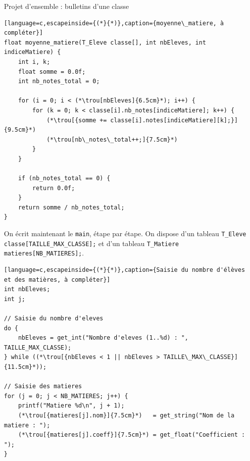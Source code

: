 \begin{UPSTIexercice}{Projet d'ensemble : bulletins d'une classe}
    \begin{lstlisting}[language=c,escapeinside={(*}{*)},caption={moyenne\_matiere, à compléter}]
float moyenne_matiere(T_Eleve classe[], int nbEleves, int indiceMatiere) {
    int i, k;
    float somme = 0.0f;
    int nb_notes_total = 0;

    for (i = 0; i < (*\trou[nbEleves]{6.5cm}*); i++) {
        for (k = 0; k < classe[i].nb_notes[indiceMatiere]; k++) {
            (*\trou[{somme += classe[i].notes[indiceMatiere][k];}]{9.5cm}*)
            (*\trou[nb\_notes\_total++;]{7.5cm}*)
        }
    }

    if (nb_notes_total == 0) {
        return 0.0f;
    }
    return somme / nb_notes_total;
}
\end{lstlisting}

    On écrit maintenant le \texttt{main}, étape par étape. On dispose d'un tableau
    \texttt{T\_Eleve classe[TAILLE\_MAX\_CLASSE];} et d'un tableau \texttt{T\_Matiere matieres[NB\_MATIERES];}.


\begin{lstlisting}[language=c,escapeinside={(*}{*)},caption={Saisie du nombre d'élèves et des matières, à compléter}]
int nbEleves;
int j;

// Saisie du nombre d'eleves
do {
    nbEleves = get_int("Nombre d'eleves (1..%d) : ", TAILLE_MAX_CLASSE);
} while ((*\trou[{nbEleves < 1 || nbEleves > TAILLE\_MAX\_CLASSE}]{11.5cm}*));

// Saisie des matieres
for (j = 0; j < NB_MATIERES; j++) {
    printf("Matiere %d\n", j + 1);
    (*\trou[{matieres[j].nom}]{7.5cm}*)   = get_string("Nom de la matiere : ");
    (*\trou[{matieres[j].coeff}]{7.5cm}*) = get_float("Coefficient : ");
}
\end{lstlisting}




\end{UPSTIexercice}
